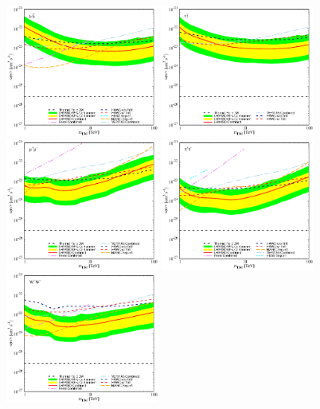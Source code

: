 \documentclass[12pt,aps,prd,amsmath,amssymb,showpacs,floats,floatfix,nofootinbib]{revtex4-1}
\begin{document}
\begin{figure}
	{\includegraphics[width=0.45\textwidth]{annihilate_combined_bottom}}
	{\includegraphics[width=0.45\textwidth]{annihilate_combined_top.eps}}
	{\includegraphics[width=0.45\textwidth]{annihilate_combined_mu.eps}}
	{\includegraphics[width=0.45\textwidth]{annihilate_combined_tau.eps}}
	{\includegraphics[width=0.45\textwidth]{annihilate_combined_ww.eps}}

\end{figure}
\end{document}
